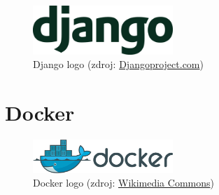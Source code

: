 \begin{figure}[H] \centering
      \includegraphics[width=150pt]{./pictures/django-logo-positive.png}
      \caption[Django logo]{Django logo (zdroj:
\href{https://static.djangoproject.com/img/logos/django-logo-positive.png}{Djangoproject.com})}
      \label{fig:django}
  \end{figure}
  
\newpage  
  
\section{Docker}

\begin{figure}[H] \centering
      \includegraphics[width=150pt]{./pictures/Docker_(container_engine)_logo.png}
      \caption[Docker logo]{Docker logo (zdroj:
\href{https://commons.wikimedia.org/wiki/File:Docker_(container_engine)_logo.png}{Wikimedia Commons})}
      \label{fig:docker}
  \end{figure}

